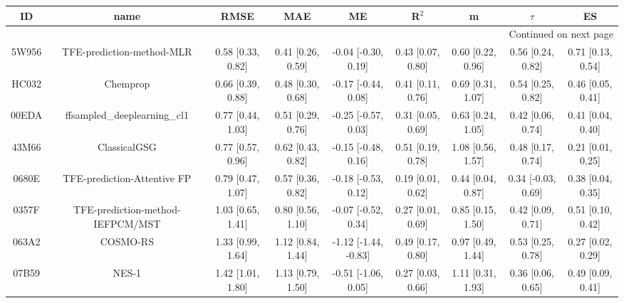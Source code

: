 \documentclass{article}
\begin{document}
\begin{center}
\scriptsize
\begin{longtable}{|ccccccccc|}
\toprule
    ID &                                    name &               RMSE &                MAE &                    ME &              R$^2$ &                     m &                $\tau$ &                    ES \\
\midrule
\endhead
\midrule
\multicolumn{9}{r}{{Continued on next page}} \\
\midrule
\endfoot

\bottomrule
\endlastfoot
 5W956 &               TFE-prediction-method-MLR &  0.58 [0.33, 0.82] &  0.41 [0.26, 0.59] &   -0.04 [-0.30, 0.19] &  0.43 [0.07, 0.80] &     0.60 [0.22, 0.96] &     0.56 [0.24, 0.82] &     0.71 [0.13, 0.54] \\
 HC032 &                                Chemprop &  0.66 [0.39, 0.88] &  0.48 [0.30, 0.68] &   -0.17 [-0.44, 0.08] &  0.41 [0.11, 0.76] &     0.69 [0.31, 1.07] &     0.54 [0.25, 0.82] &     0.46 [0.05, 0.41] \\
 00EDA &            ffsampled\_deeplearning\_cl1 &  0.77 [0.44, 1.03] &  0.51 [0.29, 0.76] &   -0.25 [-0.57, 0.03] &  0.31 [0.05, 0.69] &     0.63 [0.24, 1.05] &     0.42 [0.06, 0.74] &     0.41 [0.04, 0.40] \\
 43M66 &                            ClassicalGSG &  0.77 [0.57, 0.96] &  0.62 [0.43, 0.82] &   -0.15 [-0.48, 0.16] &  0.51 [0.19, 0.78] &     1.08 [0.56, 1.57] &     0.48 [0.17, 0.74] &     0.21 [0.01, 0.25] \\
 0680E &             TFE-prediction-Attentive FP &  0.79 [0.47, 1.07] &  0.57 [0.36, 0.82] &   -0.18 [-0.53, 0.12] &  0.19 [0.01, 0.62] &     0.44 [0.04, 0.87] &    0.34 [-0.03, 0.69] &     0.38 [0.04, 0.35] \\
 0357F &        TFE-prediction-method-IEFPCM/MST &  1.03 [0.65, 1.41] &  0.80 [0.56, 1.10] &   -0.07 [-0.52, 0.34] &  0.27 [0.01, 0.69] &     0.85 [0.15, 1.50] &     0.42 [0.09, 0.71] &     0.51 [0.10, 0.42] \\
 063A2 &                                COSMO-RS &  1.33 [0.99, 1.64] &  1.12 [0.84, 1.44] &  -1.12 [-1.44, -0.83] &  0.49 [0.17, 0.80] &     0.97 [0.49, 1.44] &     0.53 [0.25, 0.78] &     0.27 [0.02, 0.29] \\
 07B59 &                                   NES-1 &  1.42 [1.01, 1.80] &  1.13 [0.79, 1.50] &   -0.51 [-1.06, 0.05] &  0.27 [0.03, 0.66] &     1.11 [0.31, 1.93] &     0.36 [0.06, 0.65] &     0.49 [0.09, 0.41] \\

\end{longtable}
\end{center}
\end{document}
